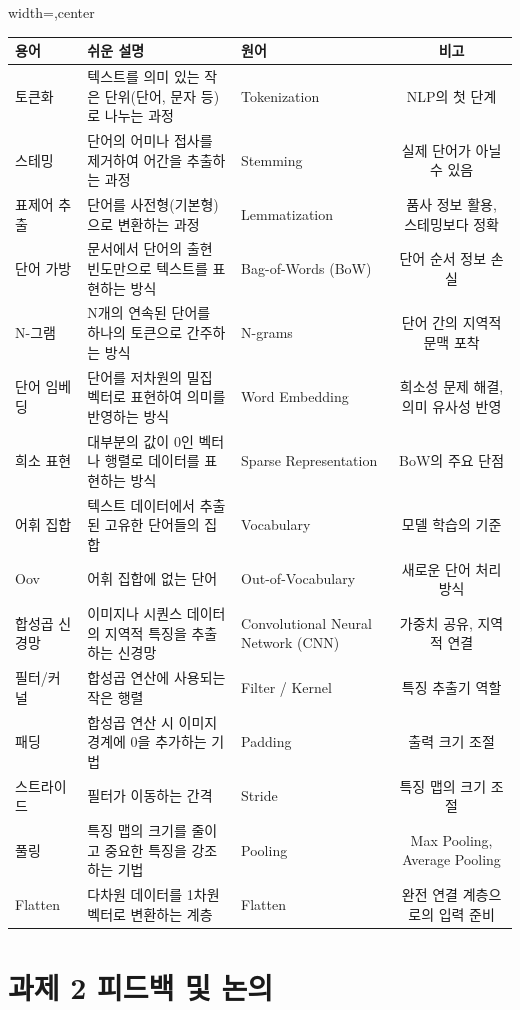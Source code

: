 \documentclass[11pt,a4paper]{article}
\begin{document}
\begin{adjustbox}{width=\textwidth,center}
\begin{tabular}{lllc}
\toprule
\textbf{용어} & \textbf{쉬운 설명} & \textbf{원어} & \textbf{비고} \\
\midrule
토큰화 & 텍스트를 의미 있는 작은 단위(단어, 문자 등)로 나누는 과정 & Tokenization & NLP의 첫 단계 \\
스테밍 & 단어의 어미나 접사를 제거하여 어간을 추출하는 과정 & Stemming & 실제 단어가 아닐 수 있음 \\
표제어 추출 & 단어를 사전형(기본형)으로 변환하는 과정 & Lemmatization & 품사 정보 활용, 스테밍보다 정확 \\
단어 가방 & 문서에서 단어의 출현 빈도만으로 텍스트를 표현하는 방식 & Bag-of-Words (BoW) & 단어 순서 정보 손실 \\
N-그램 & N개의 연속된 단어를 하나의 토큰으로 간주하는 방식 & N-grams & 단어 간의 지역적 문맥 포착 \\
단어 임베딩 & 단어를 저차원의 밀집 벡터로 표현하여 의미를 반영하는 방식 & Word Embedding & 희소성 문제 해결, 의미 유사성 반영 \\
희소 표현 & 대부분의 값이 0인 벡터나 행렬로 데이터를 표현하는 방식 & Sparse Representation & BoW의 주요 단점 \\
어휘 집합 & 텍스트 데이터에서 추출된 고유한 단어들의 집합 & Vocabulary & 모델 학습의 기준 \\
Oov & 어휘 집합에 없는 단어 & Out-of-Vocabulary & 새로운 단어 처리 방식 \\
합성곱 신경망 & 이미지나 시퀀스 데이터의 지역적 특징을 추출하는 신경망 & Convolutional Neural Network (CNN) & 가중치 공유, 지역적 연결 \\
필터/커널 & 합성곱 연산에 사용되는 작은 행렬 & Filter / Kernel & 특징 추출기 역할 \\
패딩 & 합성곱 연산 시 이미지 경계에 0을 추가하는 기법 & Padding & 출력 크기 조절 \\
스트라이드 & 필터가 이동하는 간격 & Stride & 특징 맵의 크기 조절 \\
풀링 & 특징 맵의 크기를 줄이고 중요한 특징을 강조하는 기법 & Pooling & Max Pooling, Average Pooling \\
Flatten & 다차원 데이터를 1차원 벡터로 변환하는 계층 & Flatten & 완전 연결 계층으로의 입력 준비 \\
\bottomrule
\end{tabular}
\end{adjustbox}

\newpage
\section{과제 2 피드백 및 논의}
\end{document}

